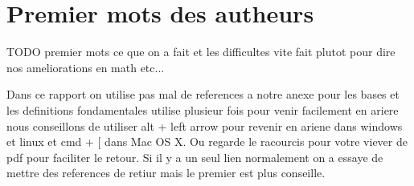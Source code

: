 \section*{Premier mots des autheurs}

TODO premier mots ce que on a fait et les difficultes vite fait plutot pour dire nos ameliorations en math etc...

Dans ce rapport on utilise pas mal de references a notre anexe pour les bases et les definitions fondamentales utilise plusieur fois pour venir facilement en ariere nous conseillons de utiliser alt + left arrow pour revenir en ariene dans windows et linux et cmd + [ dans Mac OS X. Ou regarde le racourcis pour votre viever de pdf pour faciliter le retour. Si il y a un seul lien normalement on a essaye de mettre des references de retiur mais le premier est plus conseille.
